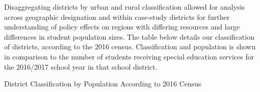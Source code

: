 \documentclass[
  english,
  man,floatsintext]{apa6}
\begin{document}
Disaggregating districts by urban and rural classification allowed for analysis across geographic designation and within case-study districts for further understanding of policy effects on regions with differing resources and large differences in student population sizes. The table below details our classification of districts, according to the 2016 census. Classification and population is shown in comparison to the number of students receiving special education services for the 2016/2017 school year in that school district.

\begin{table}[tbp]

\begin{center}
\begin{threeparttable}

\caption{\label{tab:District Census Population Table}District Classification by Population According to 2016 Census}


\end{threeparttable}
\end{center}
\end{table}
\end{document}
